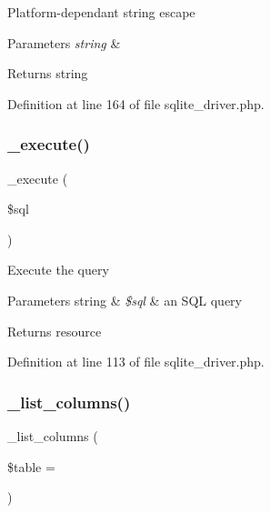 Platform-\/dependant string escape


\begin{DoxyParams}{Parameters}
{\em string} & \\
\hline
\end{DoxyParams}
\begin{DoxyReturn}{Returns}
string 
\end{DoxyReturn}


Definition at line 164 of file sqlite\+\_\+driver.\+php.

\mbox{\label{class_c_i___d_b__sqlite__driver_a114ab675d89bf8324a41785fb475e86d}} 
\subsubsection{\texorpdfstring{\_execute()}{\_execute()}}
{\footnotesize\ttfamily \+\_\+execute (\begin{DoxyParamCaption}\item[{}]{\$sql }\end{DoxyParamCaption})\hspace{0.3cm}{\ttfamily [protected]}}

Execute the query


\begin{DoxyParams}[1]{Parameters}
string & {\em \$sql} & an S\+QL query \\
\hline
\end{DoxyParams}
\begin{DoxyReturn}{Returns}
resource 
\end{DoxyReturn}


Definition at line 113 of file sqlite\+\_\+driver.\+php.

\mbox{\label{class_c_i___d_b__sqlite__driver_a7ccb7f9c301fe7f0a9db701254142b63}} 
\subsubsection{\texorpdfstring{\_list\_columns()}{\_list\_columns()}}
{\footnotesize\ttfamily \+\_\+list\+\_\+columns (\begin{DoxyParamCaption}\item[{}]{\$table = {\ttfamily \textquotesingle{}\textquotesingle{}} }\end{DoxyParamCaption})\hspace{0.3cm}{\ttfamily [protected]}}

